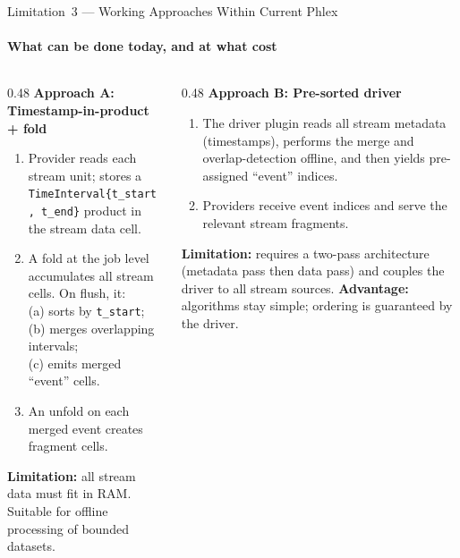 \documentclass[aspectratio=169,10pt]{beamer}
\newcommand{\good}[1]{\textcolor{green!50!black}{\textbf{#1}}}
\newcommand{\warn}[1]{\textcolor{orange!80!black}{\textbf{#1}}}
\newcommand{\code}[1]{\texttt{\small #1}}
\begin{document}

\begin{frame}{Limitation~3 --- Working Approaches Within Current Phlex}
  \framesubtitle{What can be done today, and at what cost}

  \begin{columns}[T]
    \begin{column}{0.48\textwidth}
      \textbf{Approach A: Timestamp-in-product + fold}
      \small
      \begin{enumerate}
        \item Provider reads each stream unit; stores a
              \code{TimeInterval\{t\_start, t\_end\}} product in the
              stream data cell.
        \item A fold at the job level accumulates all stream cells.
              On flush, it: \\
              (a) sorts by \code{t\_start}; \\
              (b) merges overlapping intervals; \\
              (c) emits merged ``event'' cells.
        \item An unfold on each merged event creates fragment cells.
      \end{enumerate}
      \warn{Limitation:} all stream data must fit in RAM.
      Suitable for offline processing of bounded datasets.
    \end{column}
    \begin{column}{0.48\textwidth}
      \textbf{Approach B: Pre-sorted driver}
      \small
      \begin{enumerate}
        \item The driver plugin reads all stream metadata (timestamps),
              performs the merge and overlap-detection offline, and
              then yields pre-assigned ``event'' indices.
        \item Providers receive event indices and serve the relevant
              stream fragments.
      \end{enumerate}
      \warn{Limitation:} requires a two-pass architecture (metadata
      pass then data pass) and couples the driver to all stream sources.
      \good{Advantage:} algorithms stay simple; ordering is guaranteed
      by the driver.
    \end{column}
  \end{columns}


\end{frame}
\end{document}
